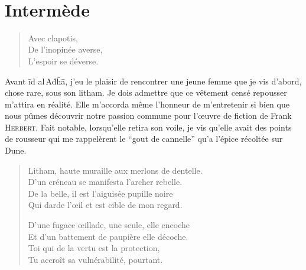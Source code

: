 \newpage{}
\thispagestyle{empty}
~
\vfill
\pagebreak

\section*{Intermède}

\begin{verse}\haiku
  Avec clapotis,\\  %
  De l’inopinée averse,\\  %
  L’espoir se déverse.
\end{verse}


\begin{prose}
  Avant īd al\,Aḋĥā, j’eu le plaisir de rencontrer une jeune femme que je vis d’abord, chose rare, sous son litham. Je dois admettre que ce vêtement censé repousser m’attira en réalité. Elle m’accorda même l’honneur de m’entretenir si bien que nous pûmes découvrir notre passion commune pour l’œuvre de fiction de Frank \textsc{Herbert}. Fait notable, lorsqu’elle retira son voile, je vis qu’elle avait des points de rousseur qui me rappelèrent le \enquote{gout de cannelle} qu’a l’épice récoltée sur Dune.
\end{prose}

\begin{verse}\quatrain
  Litham, haute muraille aux merlons de dentelle.\\  %
  D’un créneau se manifesta l’archer rebelle.\\   %
  De la belle, il est l’aiguisée pupille noire\\   %
  Qui darde l’œil et est cible de mon regard. 

  D’une fugace œillade, une seule, elle encoche\\   %
  Et d’un battement de paupière elle décoche.\\   %
  Toi qui de la vertu est la protection,\\   %
  Tu accroît sa vulnérabilité, pourtant. 
\end{verse}



